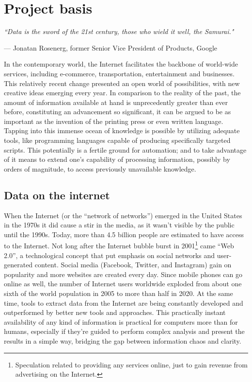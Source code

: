 \chapter{Project basis}
\label{ch:basis}
\setlength{\epigraphwidth}{11.4cm}
\epigraph{\textit{``Data is the sword of the 21st century, those who wield it well, the Samurai."}}{--- Jonatan Rosenerg, former Senior Vice President of Products, Google}

In the contemporary world, the Internet facilitates the backbone of world-wide services, including e-commerce, transportation, entertainment and businesses. This relatively recent change presented an open world of possibilities, with new creative ideas emerging every year. In comparison to the reality of the past, the amount of information available at hand is unprecedently greater than ever before, constituting an advancement so significant, it can be argued to be as important as the invention of the printing press or even written language. Tapping into this immense ocean of knowledge is possible by utilizing adequate tools, like programming languages capable of producing specifically targeted scripts. This potentially is a fertile ground for automation; and to take advantage of it means to extend one's capability of processing information, possibly by orders of magnitude, to access previously unavailable knowledge.


\section{Data on the internet}
When the Internet (or the ``network of networks'') emerged in the United States in the 1970s it did cause a stir in the media, as it wasn't visible by the public until the 1990s. Today, more than 4.5 billion people are estimated to have access to the Internet. Not long after the Internet bubble burst in 2001\footnote{Speculation related to providing any services online, just to gain revenue from advertising on the Internet.} came ``Web 2.0'', a technological concept that put emphasis on social networks and user-generated content. Social media (Facebook, Twitter, and Instagram) gain on popularity and more websites are created every day. Since mobile phones can go online as well, the number of Internet users worldwide exploded from about one sixth of the world population in 2005 to more than half in 2020. At the same time, tools to extract data from the Internet are being constantly developed and outperformed by better new tools and approaches. This practically instant availability of any kind of information is practical for computers more than for humans, especially if they're guided to perform complex analysis and present the results in a simple way, bridging the gap between information chaos and clarity.


